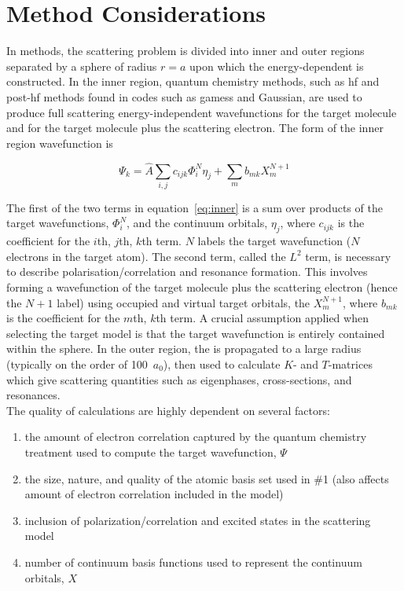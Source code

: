 \clearpage 

\appendix

\section{\rmat{} Method Considerations}
In \rmat{} methods, 
the scattering problem is divided into inner
and outer regions separated by a
sphere of radius $r=a$ upon which the energy-dependent \rmat
is constructed. In the inner region, quantum chemistry
methods, such as \ac{hf} and post-\ac{hf} methods found in
codes such as \ac{gamess}\cite{gamess1993} and Gaussian\cite{g16}, 
are used to produce full scattering energy-independent
wavefunctions for the target molecule and for the target
molecule plus the scattering electron. The form of the inner
region wavefunction is

\begin{equation}
		\Psi_k = \hat{A}\sum_{i,j} c_{ijk} \Phi_i^N \eta_j + \sum_m b_{mk} X_m^{N+1} \label{eq:inner}
\end{equation}

The first of the two terms in equation~\ref{eq:inner} is a sum over
products of the target wavefunctions, $\Phi_i^N$, and
the continuum orbitals, $\eta_j$, where $c_{ijk}$ is the coefficient for the
$i$th, $j$th, $k$th term. $N$ labels the target wavefunction ($N$ electrons in the target atom).
The second term, called the $L^2$ term, is
necessary to describe polarisation/correlation and resonance
formation. This involves forming a wavefunction of the target
molecule plus the scattering electron (hence the $N+1$ label) using occupied and
virtual target orbitals, the $X_m^{N+1}$,
where $b_{mk}$ is the coefficient for the $m$th, $k$th term.
A crucial assumption applied when selecting the target
model is that the target wavefunction is entirely contained
within the \rmat{} sphere. In the outer region, the \rmat
is propagated to a large radius (typically on the order of 100~$a_0$), 
then used to calculate $K$- and $T$-matrices which give scattering quantities
such as eigenphases, cross-sections, and resonances.\\

The quality of \rmat{} calculations are highly dependent on several factors:
\begin{enumerate}
		\item the amount of electron correlation captured by the quantum chemistry
				treatment used to compute the target wavefunction, $\Psi$
		\item the size, nature, and quality of the atomic basis set used in \#1 (also
				affects amount of electron correlation included in the model)
		\item inclusion of polarization/correlation and excited states in the 
				scattering model
		\item number of continuum basis functions used to represent the continuum
				orbitals, $X$
\end{enumerate}

